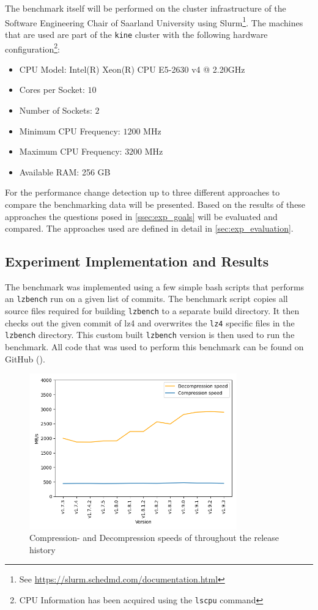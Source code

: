 \documentclass[	runningheads,
				a4paper]{llncs}
\begin{document}
The benchmark itself will be performed on the cluster infrastructure of the Software Engineering Chair of Saarland University using Slurm\footnote{See \url{https://slurm.schedmd.com/documentation.html}}. The machines that are used are part of the \texttt{kine} cluster with the following hardware configuration\footnote{CPU Information has been acquired using the \texttt{lscpu} command}:

\begin{itemize}
	\item CPU Model: Intel(R) Xeon(R) CPU E5-2630 v4 @ 2.20GHz
	\item Cores per Socket: $10$
	\item Number of Sockets: $2$
	\item Minimum CPU Frequency: $1200$ MHz
	\item Maximum CPU Frequency: $3200$ MHz
	\item Available RAM: 256 GB
\end{itemize}

For the performance change detection up to three different approaches to compare the benchmarking data will be presented. Based on the results of these approaches the questions posed in \autoref{ssec:exp_goals} will be evaluated and compared. The approaches used are defined in detail in \autoref{sec:exp_evaluation}.

	\subsection{Experiment Implementation and Results}

	The benchmark was implemented using a few simple bash scripts that performs an \texttt{lzbench} run on a given list of commits. The benchmark script copies all source files required for building \texttt{lzbench} to a separate build directory. It then checks out the given commit of lz4 and overwrites the \texttt{lz4} specific files in the \texttt{lzbench} directory. This custom built \texttt{lzbench} version is then used to run the benchmark. All code that was used to perform this benchmark can be found on GitHub (\cite{gitSysBench}).

	\begin{figure}[ht!]
		\centering
		\includegraphics[width=0.8\textwidth]{graph/lz4_releases_plot}
		\caption{Compression- and Decompression speeds of throughout the release history}
		\label{fig:release-bench}
	\end{figure}
\end{document}
